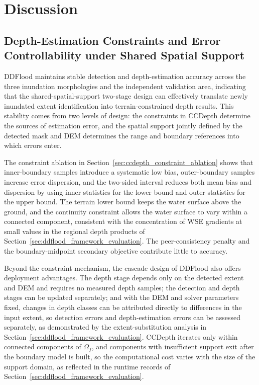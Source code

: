 \documentclass[authoryear,preprint,12pt]{elsarticle}
\begin{document}
\FloatBarrier

\section{Discussion}

\subsection{Depth-Estimation Constraints and Error Controllability under Shared Spatial Support}

DDFlood maintains stable detection and depth-estimation accuracy across the three inundation morphologies and the independent validation area, indicating that the shared-spatial-support two-stage design can effectively translate newly inundated extent identification into terrain-constrained depth results. This stability comes from two levels of design: the constraints in CCDepth determine the sources of estimation error, and the spatial support jointly defined by the detected mask and DEM determines the range and boundary references into which errors enter.

The constraint ablation in Section~\ref{sec:ccdepth_constraint_ablation} shows that inner-boundary samples introduce a systematic low bias, outer-boundary samples increase error dispersion, and the two-sided interval reduces both mean bias and dispersion by using inner statistics for the lower bound and outer statistics for the upper bound. The terrain lower bound keeps the water surface above the ground, and the continuity constraint allows the water surface to vary within a connected component, consistent with the concentration of WSE gradients at small values in the regional depth products of Section~\ref{sec:ddflood_framework_evaluation}. The peer-consistency penalty and the boundary-midpoint secondary objective contribute little to accuracy.

Beyond the constraint mechanism, the cascade design of DDFlood also offers deployment advantages. The depth stage depends only on the detected extent and DEM and requires no measured depth samples; the detection and depth stages can be updated separately; and with the DEM and solver parameters fixed, changes in depth classes can be attributed directly to differences in the input extent, so detection errors and depth-estimation errors can be assessed separately, as demonstrated by the extent-substitution analysis in Section~\ref{sec:ddflood_framework_evaluation}. CCDepth iterates only within connected components of \(\Omega_f\), and components with insufficient support exit after the boundary model is built, so the computational cost varies with the size of the support domain, as reflected in the runtime records of Section~\ref{sec:ddflood_framework_evaluation}.
\end{document}
